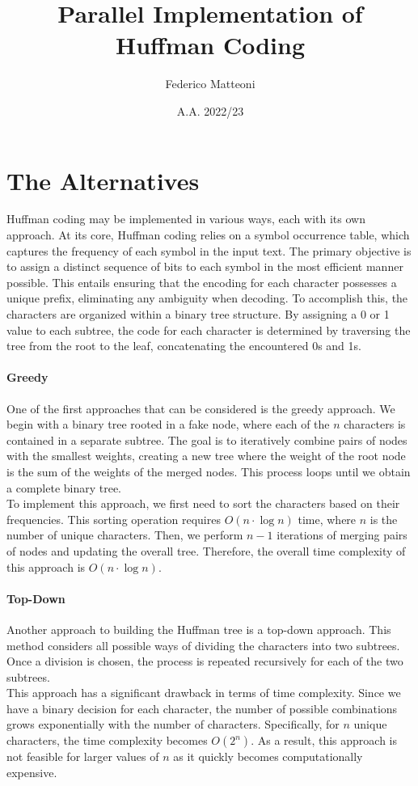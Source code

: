 \documentclass[10pt]{article}
\begin{document}
\title{Parallel Implementation of Huffman Coding}
\author{Federico Matteoni}
\date{A.A. 2022/23}
\maketitle

\section{The Alternatives}
Huffman coding may be implemented in various ways, each with its own approach. At its core, Huffman coding relies on a symbol occurrence table, which captures the frequency of each symbol in the input text. The primary objective is to assign a distinct sequence of bits to each symbol in the most efficient manner possible. This entails ensuring that the encoding for each character possesses a unique prefix, eliminating any ambiguity when decoding. To accomplish this, the characters are organized within a binary tree structure. By assigning a 0 or 1 value to each subtree, the code for each character is determined by traversing the tree from the root to the leaf, concatenating the encountered 0s and 1s.
\paragraph{Greedy} One of the first approaches that can be considered is the greedy approach. We begin with a binary tree rooted in a fake node, where each of the $n$ characters is contained in a separate subtree. The goal is to iteratively combine pairs of nodes with the smallest weights, creating a new tree where the weight of the root node is the sum of the weights of the merged nodes. This process loops until we obtain a complete binary tree.\\
To implement this approach, we first need to sort the characters based on their frequencies. This sorting operation requires $O(n\cdot\log n)$ time, where $n$ is the number of unique characters. Then, we perform $n-1$ iterations of merging pairs of nodes and updating the overall tree. Therefore, the overall time complexity of this approach is $O(n\cdot\log n)$.
\paragraph{Top-Down} Another approach to building the Huffman tree is a top-down approach. This method considers all possible ways of dividing the characters into two subtrees. Once a division is chosen, the process is repeated recursively for each of the two subtrees.\\
This approach has a significant drawback in terms of time complexity. Since we have a binary decision for each character, the number of possible combinations grows exponentially with the number of characters. Specifically, for $n$ unique characters, the time complexity becomes $O(2^n)$. As a result, this approach is not feasible for larger values of $n$ as it quickly becomes computationally expensive.
\end{document}
